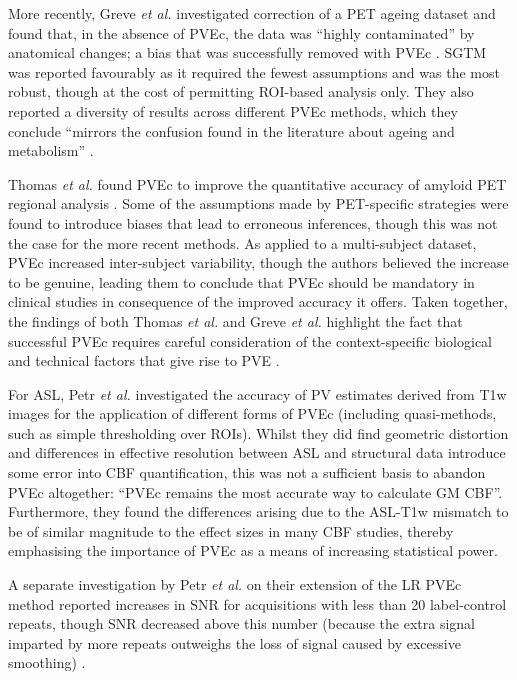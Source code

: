 \documentclass[12pt]{report}
\begin{document}
More recently, Greve \textit{et al.} investigated correction of a PET ageing dataset and found that, in the absence of PVEc, the data was ``highly contaminated'' by anatomical changes; a bias that was successfully removed with PVEc \cite{Greve2016}. SGTM was reported favourably as it required the fewest assumptions and was the most robust, though at the cost of permitting ROI-based analysis only. They also reported a diversity of results across different PVEc methods, which they conclude ``mirrors the confusion found in the literature about ageing and metabolism'' \cite{Greve2016}. 

Thomas \textit{et al.} found PVEc to improve the quantitative accuracy of amyloid PET regional analysis \cite{Thomas2011}. Some of the assumptions made by PET-specific strategies were found to introduce biases that lead to erroneous inferences, though this was not the case for the more recent methods. As applied to a multi-subject dataset, PVEc increased inter-subject variability, though the authors believed the increase to be genuine, leading them to conclude that PVEc should be mandatory in clinical studies in consequence of the improved accuracy it offers. Taken together, the findings of both Thomas \textit{et al.} and Greve \textit{et al.} highlight the fact that successful PVEc requires careful consideration of the context-specific biological and technical factors that give rise to PVE \cite{Thomas2011, Greve2016}. 

For ASL, Petr \textit{et al.} \cite{Petr2018} investigated the accuracy of PV estimates derived from T1w images for the application of different forms of PVEc (including quasi-methods, such as simple thresholding over ROIs). Whilst they did find geometric distortion and differences in effective resolution between ASL and structural data introduce some error into CBF quantification, this was not a sufficient basis to abandon PVEc altogether: ``PVEc remains the most accurate way to calculate GM CBF''. Furthermore, they found the differences arising due to the ASL-T1w mismatch to be of similar magnitude to the effect sizes in many CBF studies, thereby emphasising the importance of PVEc as a means of increasing statistical power. 

A separate investigation by Petr \textit{et al.} on their extension of the LR PVEc method reported increases in SNR for acquisitions with less than 20 label-control repeats, though SNR decreased above this number (because the extra signal imparted by more repeats outweighs the loss of signal caused by excessive smoothing) \cite{Petr2010}. 
\end{document}
